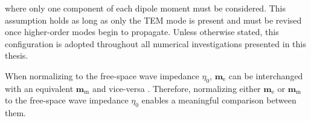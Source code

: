where only one component of each dipole moment must be considered. This 
assumption holds as long as only the TEM mode is present and must be 
revised once higher-order modes begin to propagate. Unless otherwise 
stated, this configuration is adopted throughout all numerical 
investigations presented in this thesis.

When normalizing to the free-space wave impedance $\eta_0$, $\mathbf{m}_\mathrm{e}$ can be interchanged with an equivalent $\mathbf{m}_\mathrm{m}$ and vice-versa \cite[p.~414]{Jackson}. Therefore, normalizing either $\mathbf{m}_{\mathrm{e}}$ or $\mathbf{m}_{\mathrm{m}}$ to the free-space wave impedance $\eta_0$ enables a meaningful comparison between them.




%

%

